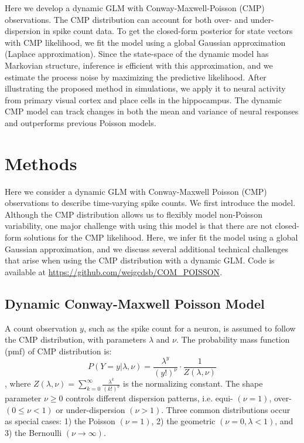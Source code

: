 \documentclass[aoas]{imsart}
\theoremstyle{plain}
\theoremstyle{remark}
\begin{document}
Here we develop a dynamic GLM with Conway-Maxwell-Poisson (CMP) observations. The CMP distribution can account for both over- and under-dispersion in spike count data. To get the closed-form posterior for state vectors with CMP likelihood, we fit the model using a global Gaussian approximation (Laplace approximation). Since the state-space of the dynamic model has Markovian structure, inference is efficient with this approximation, and we estimate the process noise by maximizing the predictive likelihood. After illustrating the proposed method in simulations, we apply it to neural activity from primary visual cortex and place cells in the hippocampus. The dynamic CMP model can track changes in both the mean and variance of neural responses and outperforms previous Poisson models.

\section{Methods}
Here we consider a dynamic GLM with Conway-Maxwell Poisson (CMP) observations to describe time-varying spike counts. We first introduce the model. Although the CMP distribution allows us to flexibly model non-Poisson variability, one major challenge with using this model is that there are not closed-form solutions for the CMP likelihood. Here, we infer fit the model using a global Gaussian approximation, and we discuss several additional technical challenges that arise when using the CMP distribution with a dynamic GLM. Code is available at \url{https://github.com/weigcdsb/COM_POISSON}. 

\subsection{Dynamic Conway-Maxwell Poisson Model}
A count observation $y$, such as the spike count for a neuron, is assumed to follow the CMP distribution, with parameters $\lambda$ and $\nu$. The probability mass function (pmf) of CMP distribution is:
\begin{equation}
	P(Y=y|\lambda, \nu) = \frac{\lambda^y}{(y!)^\nu}\cdot\frac{1}{Z(\lambda, \nu)}
\end{equation}
, where $Z(\lambda, \nu)=\sum_{k=0}^{\infty}\frac{\lambda^k}{(k!)^\nu}$ is the normalizing constant. The shape parameter $\nu \geq 0$ controls different dispersion patterns, i.e. equi- $(\nu=1)$, over- $(0\leq\nu<1)$ or under-dispersion $(\nu > 1)$. Three common distributions occur as special cases: 1) the Poisson $(\nu=1)$, 2) the geometric $(\nu=0, \lambda<1)$, and 3) the Bernoulli $(\nu \rightarrow \infty)$.
\end{document}
